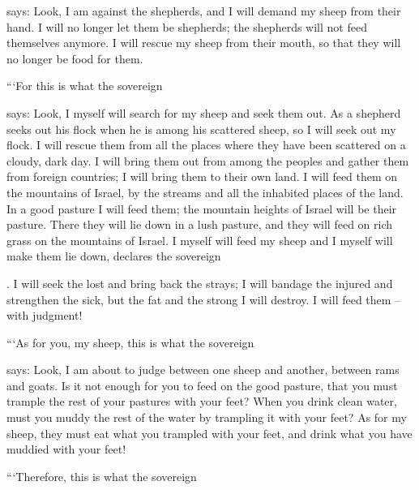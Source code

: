 {{}
says: Look,
I am against the shepherds,
and I will demand
my sheep
from their hand.
I will
no longer
let them be shepherds;
the shepherds
will not
feed
themselves anymore.
I will rescue
my
sheep
from their
mouth,
so that they will no
longer be
food for them.
\par }{\PP {}“‘For
this is what
the sovereign

{}
says: Look,
I myself
will search
for my sheep
and seek them out.
As a shepherd
seeks
out his flock
when
he is among
his scattered
sheep,
so
I will seek out
my flock.
I will rescue
them from all
the places
where
they have
been scattered
on a cloudy,
dark
day.
I will bring them out
from
among the peoples
and gather
them from
foreign countries;
I will bring
them to
their own land.
I will feed
them
on the mountains
of Israel,
by the streams
and all
the inhabited places
of the land.
In a good
pasture
I will feed
them; the
mountain
heights
of Israel
will be
their pasture.
There
they will lie
down in a lush
pasture,
and they will feed
on rich
grass on the mountains
of Israel.
I myself
will feed
my sheep
and I myself
will make them lie
down, declares
the sovereign

{}.
I will seek
the lost
and bring back
the strays;
I will bandage
the injured
and strengthen
the sick,
but the fat
and the strong
I will destroy.
I will feed them – with judgment!
\par }{\PP {}“‘As for you,
my sheep,
this is what
the sovereign

{}
says: Look,
I am about to judge
between
one sheep
and another,
between rams
and goats.
Is it not enough
for you to feed
on the good
pasture,
that you must trample
the rest
of your pastures
with your feet? When you drink
clean
water,
must you muddy
the rest
of the water by trampling it with your feet?
As for my sheep,
they must eat what you trampled
with your feet,
and drink
what you have muddied
with your feet!
\par }{\PP {}“‘Therefore,
this is what
the sovereign

}
